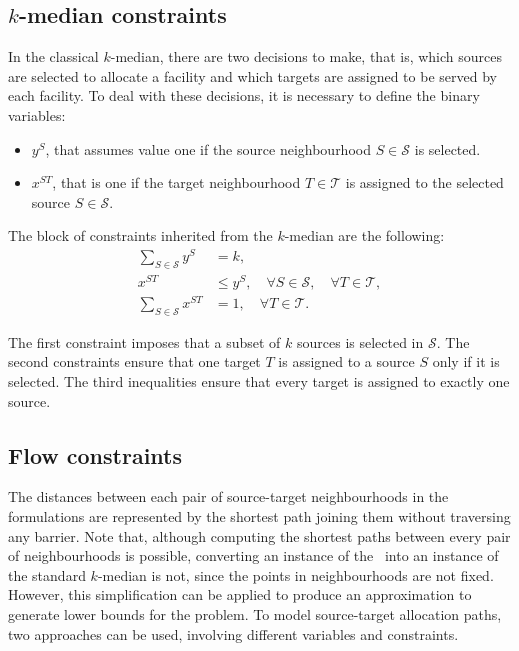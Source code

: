 \documentclass[a4paper,  review, authoryear, 1p.]{elsarticle}
\newcommand{\KMPHN}{{\sf{H-KMPHN}}}
\newcommand{\CV}[1]{{\color{blue}#1}}
\begin{document}
	\CV{
	\subsection{$k$-median constraints}
	In the classical $k$-median, there are two decisions to make, that is, which sources are selected to allocate a facility and which targets are assigned to be served by each facility. To deal with these decisions, it is necessary to define the binary variables:
	\begin{itemize}
		\item $y^S$, that assumes value one if the source neighbourhood $S\in\mathcal S$ is selected.
		\item $x^{ST}$, that is one if the target neighbourhood $T\in\mathcal T$ is assigned to the selected source $S\in\mathcal S$.
	\end{itemize}
	
	The block of constraints inherited from the $k$-median are the following:
	\begin{align}
		\sum_{S\in\mathcal S}y^S&=k,\label{eq:k-median1C}\tag{k-median-C1}\\
		x^{ST}&\leq y^S,\quad\forall S\in\mathcal S,\quad\forall T\in\mathcal T,\label{eq:k-median2C}\tag{k-median-C2}\\
		\sum_{S\in\mathcal S} x^{ST}&=1,\quad\forall T\in\mathcal T\label{eq:k-median3C}\tag{k-median-C3}.
	\end{align}
	
	The first constraint imposes that a subset of $k$ sources is selected in $\mathcal S$. The second constraints ensure that one target $T$ is assigned to a source $S$ only if it is selected. The third inequalities ensure that every target is assigned to exactly one source.
	
	\subsection{Flow constraints}
	The distances between each pair of source-target neighbourhoods in the formulations are represented by the shortest path joining them without traversing any barrier. Note that, although computing the shortest paths between every pair of neighbourhoods is possible, converting an instance of the \KMPHN \ into an instance of the standard $k$-median is not, since the points in neighbourhoods are not fixed. However, this simplification can be applied to produce an approximation to generate lower bounds for the problem. To model source-target allocation paths, two approaches can be used, involving different variables and constraints. 
	
}
\end{document}
